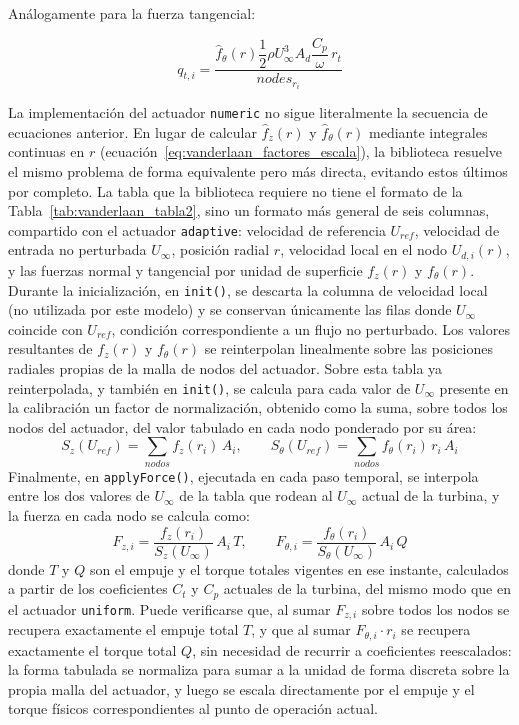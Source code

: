 Análogamente para la fuerza tangencial:

\begin{equation}
q_{t,i} = \frac{\hat{f}_\theta(r) \dfrac{1}{2}\rho U_{\infty}^3 A_d \dfrac{C_p}{\omega} \, r_t}{nodes_{r_i}}
\label{eq:vanderlaan_qt}
\end{equation}

La implementación del actuador \texttt{numeric} no sigue literalmente la secuencia de ecuaciones anterior. En lugar de calcular $\hat{f}_z(r)$ y $\hat{f}_\theta(r)$ mediante integrales continuas en $r$ (ecuación~\ref{eq:vanderlaan_factores_escala}), la biblioteca resuelve el mismo problema de forma equivalente pero más directa, evitando estos últimos por completo. La tabla que la biblioteca requiere no tiene el formato de la Tabla~\ref{tab:vanderlaan_tabla2}, sino un formato más general de seis columnas, compartido con el actuador \texttt{adaptive}: velocidad de referencia $U_{ref}$, velocidad de entrada no perturbada $U_\infty$, posición radial $r$, velocidad local en el nodo $U_{d,i}(r)$, y las fuerzas normal y tangencial por unidad de superficie $f_z(r)$ y $f_\theta(r)$. Durante la inicialización, en \texttt{init()}, se descarta la columna de velocidad local (no utilizada por este modelo) y se conservan únicamente las filas donde $U_\infty$ coincide con $U_{ref}$, condición correspondiente a un flujo no perturbado. Los valores resultantes de $f_z(r)$ y $f_\theta(r)$ se reinterpolan linealmente sobre las posiciones radiales propias de la malla de nodos del actuador.
Sobre esta tabla ya reinterpolada, y también en \texttt{init()}, se calcula para cada valor de $U_{\infty}$ presente en la calibración un factor de normalización, obtenido como la suma, sobre todos los nodos del actuador, del valor tabulado en cada nodo ponderado por su área:
\begin{equation}
S_z(U_{ref}) = \sum_{nodos} f_z(r_i)\, A_i, \qquad S_\theta(U_{ref}) = \sum_{nodos} f_\theta(r_i)\, r_i\, A_i
\label{eq:numeric_normalizacion}
\end{equation}
Finalmente, en \texttt{applyForce()}, ejecutada en cada paso temporal, se interpola entre los dos valores de $U_{\infty}$ de la tabla que rodean al $U_{\infty}$ actual de la turbina, y la fuerza en cada nodo se calcula como:
\begin{equation}
F_{z,i} = \frac{f_z(r_i)}{S_z(U_{\infty})}\, A_i \, T, \qquad F_{\theta,i} = \frac{f_\theta(r_i)}{S_\theta(U_{\infty})}\, A_i \, Q
\label{eq:numeric_fuerza_nodo}
\end{equation}
donde $T$ y $Q$ son el empuje y el torque totales vigentes en ese instante, calculados a partir de los coeficientes $C_t$ y $C_p$ actuales de la turbina, del mismo modo que en el actuador \texttt{uniform}. Puede verificarse que, al sumar $F_{z,i}$ sobre todos los nodos se recupera exactamente el empuje total $T$, y que al sumar $F_{\theta,i} \cdot r_i$ se recupera exactamente el torque total $Q$, sin necesidad de recurrir a coeficientes reescalados: la forma tabulada se normaliza para sumar a la unidad de forma discreta sobre la propia malla del actuador, y luego se escala directamente por el empuje y el torque físicos correspondientes al punto de operación actual.

